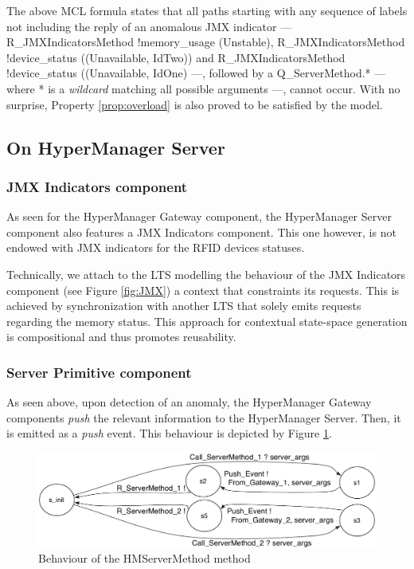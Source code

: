	\noindent The above \ac{MCL} formula states that all paths starting with any sequence of labels
	not including the reply of an anomalous \ac{JMX} indicator --- \textsf{R\_JMXIndicatorsMethod !memory\_usage (Unstable)},
	\textsf{R\_JMXIndicatorsMethod !device\_status ((Unavailable, IdTwo))} and 
	\textsf{R\_JMXIndicatorsMethod !device\_status ((Unavailable, IdOne)} ---, followed by
	a \textsf{Q\_ServerMethod.*} --- where * is a \textit{wildcard} matching all possible arguments ---, cannot occur.	
	With no surprise, Property \ref{prop:overload} is also proved to be satisfied by the model.


\subsection{On HyperManager Server}
\label{sub:hmserververif}
	
	
\subsubsection{\textsf{JMX Indicators} component}		
	
		As seen for the \textsf{HyperManager Gateway} component, the \textsf{HyperManager Server} component also features 
	a 	\textsf{JMX Indicators} component.	This one however, is not endowed with \ac{JMX} indicators
	for the \ac{RFID} devices statuses. 
	
		Technically, we attach to the \ac{LTS} modelling the behaviour of the \textsf{JMX Indicators}
		component (see Figure \ref{fig:JMX})
	a context that constraints its requests. This is achieved by synchronization with another \ac{LTS}
	that solely emits requests regarding the memory status. This approach for contextual state-space 
	generation is compositional and thus promotes reusability. 
		

\subsubsection{\textsf{Server Primitive} component}		

   As seen above, upon detection of an anomaly, the \textsf{HyperManager Gateway} components \textit{push} 
   the relevant information to the \textsf{HyperManager Server}. Then, it is emitted as a
  \textit{push} event. This behaviour is depicted by Figure \ref{fig:SM}. 
  
	\begin{figure}[H]
		\centering
		\includegraphics[scale=0.5]{figures/chapter3/HMServerMethod.pdf}
		\caption{Behaviour of the HMServerMethod method}
		\label{fig:SM}		
	\end{figure}	  
  
